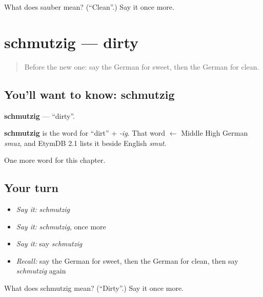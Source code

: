 \begin{tcolorbox}[breakable,colback=teal!4,colframe=teal!35!black,title={Before you move on}]
What does sauber mean? (\textquotedblleft{}Clean\textquotedblright{}.) Say it once more.
\end{tcolorbox}
\section[schmutzig]{schmutzig — dirty}

\label{lesson:GE-C92-schmutzig}



\begin{quote}
Before the new one: say the German for sweet, then the German for clean.
\end{quote}

\subsection*{You'll want to know: schmutzig}
\textbf{schmutzig} — \textquotedblleft{}dirty\textquotedblright{}.

\begin{cousinweb}
\textbf{schmutzig} is the word for \textquotedblleft{}dirt\textquotedblright{} + \emph{-ig}. That word $\leftarrow$ Middle High German \emph{smuz}, and EtymDB 2.1 lists it beside English \emph{smut}.
\end{cousinweb}

\begin{grammarlens}[title={What you've built}]
One more word for this chapter.
\end{grammarlens}

\subsection*{Your turn}
\begin{itemize}
\raggedright
  \item \emph{Say it:} \emph{schmutzig}
  \item \emph{Say it:} \emph{schmutzig}, once more
  \item \emph{Say it:} say \emph{schmutzig}
  \item \emph{Recall:} say the German for sweet, then the German for clean, then say \emph{schmutzig} again
\end{itemize}

\begin{tcolorbox}[breakable,colback=teal!4,colframe=teal!35!black,title={Before you move on}]
What does schmutzig mean? (\textquotedblleft{}Dirty\textquotedblright{}.) Say it once more.
\end{tcolorbox}

